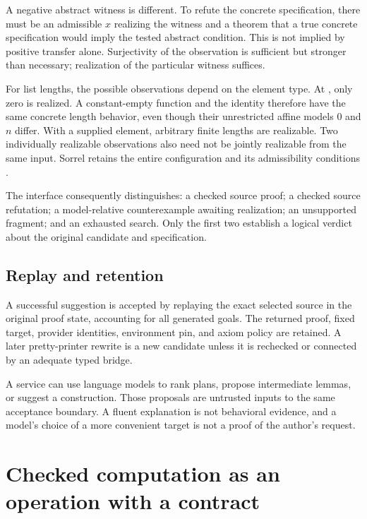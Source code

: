 \documentclass[11pt,a4paper]{article}
\newcommand{\code}[1]{\texttt{\detokenize{#1}}}
\numberwithin{equation}{section}
\theoremstyle{definition}\newtheorem{definition}[theorem]{Definition}
\theoremstyle{remark}\newtheorem{remark}[theorem]{Remark}
\begin{document}
A negative abstract witness is different. To refute the concrete specification,
there must be an admissible \(x\) realizing the witness and a theorem that a
true concrete specification would imply the tested abstract condition. This
is not implied by positive transfer alone. Surjectivity of the observation is
sufficient but stronger than necessary; realization of the particular witness
suffices.

For list lengths, the possible observations depend on the element type.
At \code{List Empty}, only zero is realized. A constant-empty function and the
identity therefore have the same concrete length behavior, even though their
unrestricted affine models \(0\) and \(n\) differ. With a supplied element,
arbitrary finite lengths are realizable. Two individually realizable
observations also need not be jointly realizable from the same input. Sorrel
retains the entire configuration and its admissibility conditions
\cite{synA,synB}.

The interface consequently distinguishes: a checked source proof; a checked
source refutation; a model-relative counterexample awaiting realization; an
unsupported fragment; and an exhausted search. Only the first two establish a
logical verdict about the original candidate and specification.

\subsection{Replay and retention}
A successful suggestion is accepted by replaying the exact selected source in
the original proof state, accounting for all generated goals. The returned
proof, fixed target, provider identities, environment pin, and axiom policy
are retained. A later pretty-printer rewrite is a new candidate unless it is
rechecked or connected by an adequate typed bridge.

A service can use language models to rank plans, propose intermediate lemmas,
or suggest a construction. Those proposals are untrusted inputs to the same
acceptance boundary. A fluent explanation is not behavioral evidence, and a
model's choice of a more convenient target is not a proof of the author's
request.

\section{Checked computation as an operation with a contract}\label{sec:cas}
\end{document}
